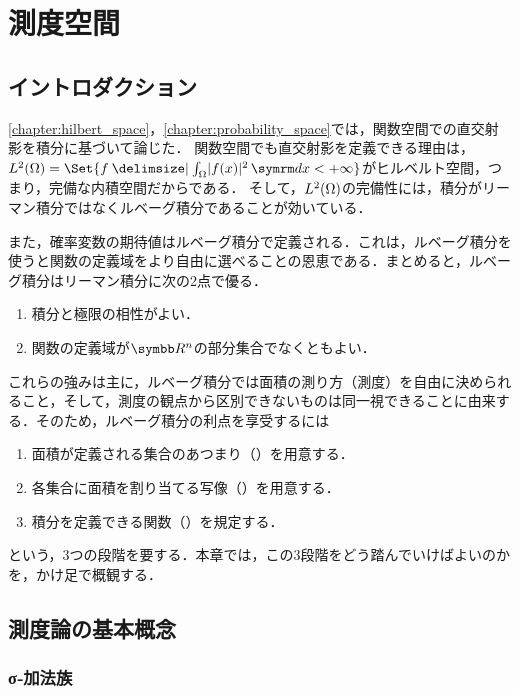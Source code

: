 \documentclass[../../main]{subfiles}
\begin{document}
\chapter{測度空間}

\section{イントロダクション}

\cref{chapter:hilbert_space}，\cref{chapter:probability_space}では，関数空間での直交射影を積分に基づいて論じた．
関数空間でも直交射影を定義できる理由は，\(\Lebesgue{2}(\Omega)=\Set{f\given\int_\Omega\abs{f(x)}^2\intd{x}<+\infty}\)がヒルベルト空間，つまり，完備な内積空間だからである．
そして，\(\Lebesgue{2}(\Omega)\)の完備性には，積分がリーマン積分ではなくルベーグ積分であることが効いている．

また，確率変数の期待値はルベーグ積分で定義される．これは，ルベーグ積分を使うと関数の定義域をより自由に選べることの恩恵である．まとめると，ルベーグ積分はリーマン積分に次の2点で優る．
\begin{enumerate}
  \item 積分と極限の相性がよい．
  \item 関数の定義域が\(\numset{R}^n\)の部分集合でなくともよい．
\end{enumerate}

これらの強みは主に，ルベーグ積分では面積の測り方（測度）を自由に決められること，そして，測度の観点から区別できないものは同一視できることに由来する．そのため，ルベーグ積分の利点を享受するには
\begin{enumerate}
  \item 面積が定義される集合のあつまり（）を用意する．
  \item 各集合に面積を割り当てる写像（）を用意する．
  \item 積分を定義できる関数（）を規定する．
\end{enumerate}
という，3つの段階を要する．本章では，この3段階をどう踏んでいけばよいのかを，かけ足で概観する．

\section{測度論の基本概念}

\subsection{σ‐加法族}
\end{document}
